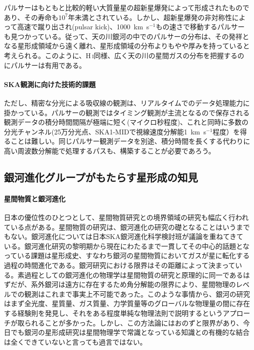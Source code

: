 パルサーはもともと比較的軽い大質量星の超新星爆発によって形成されたものであり、その寿命も$10^{7}$年未満とされている。しかし、超新星爆発の非対称性によって高速で蹴り出され(pulsar kick)、1000~km~s$^{-1}$もの速さで移動するパルサーも見つかっている。従って、天の川銀河の中でのパルサーの分布は、その発祥となる星形成領域から遠く離れ、星形成領域の分布よりもやや厚みを持っていると考えられる。このように、H\,\textsc{i}同様、広く天の川の星間ガスの分布を把握するのにパルサーは有用である。

\paragraph{SKA観測に向けた技術的課題}

ただし、精密な分光による吸収線の観測は、リアルタイムでのデータ処理能力に掛かっている。パルサーの観測ではタイミング観測が主流となるので保存される観測データの積分時間間隔が極端に短く(マイクロ秒程度)、これと同時に多数の分光チャンネル(25万分光点、SKA1-MIDで視線速度分解能1~km~s$^{-1}$程度）を得ることは難しい。同じパルサー観測データを別途、積分時間を長くする代わりに高い周波数分解能で処理するパスも、構築することが必要であろう。


\subsection{銀河進化グループがもたらす星形成の知見}
\label{c08.s4.ss5}

\paragraph{星間物質と銀河進化}

日本の優位性のひとつとして、星間物質研究との境界領域の研究も幅広く行われている点がある。星間物質の研究は、銀河進化の研究の礎となることはいうまでもない。銀河進化については日本SKA銀河進化科学検討班が議論を重ねてきている。銀河進化研究の黎明期から現在にわたるまで一貫してその中心的話題となっている課題は星形成史、すなわち銀河の星間物質においてガスが星に転化する過程の時間進化である。銀河研究における限界はその距離によって決まっている。素過程としての銀河進化の物理学は星間物質の研究と原理的に同一であるはずだが、系外銀河は遠方に存在するため角分解能の限界により、星間物理のレベルでの観測はこれまで事実上不可能であった。このような事情から、銀河の研究はまず全光度、星質量、ガス質量、力学質量等のグローバルな物理量の間に存在する経験則を発見し、それをある程度単純な物理法則で説明するというアプローチが取られることが多かった。しかし、この方法論にはおのずと限界があり、今日でも銀河の星形成研究は星間物理学で常識となっている知識との有機的な結合は全くできていないと言っても過言ではない。

